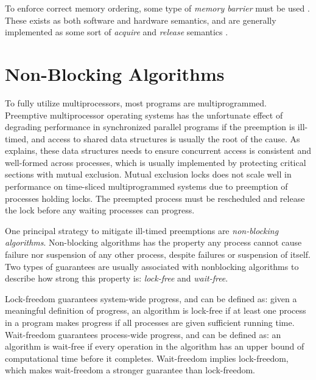 To enforce correct memory ordering, some type of \textit{memory barrier} must be used \citep{preshing2012barriers,preshing2012lockfree}. These exists as both software and hardware semantics, and are generally implemented as some sort of \textit{acquire} and \textit{release} semantics \citep{preshing2012acquire}.


\section{Non\hyp{}Blocking Algorithms}
\label{sec:nonblocking_algorithms}

To fully utilize multiprocessors, most programs are multiprogrammed. Preemptive multiprocessor operating systems has the unfortunate effect of degrading performance in synchronized parallel programs if the preemption is ill\hyp{}timed, and access to shared data structures is usually the root of the cause. As \citet{michael1998nonblocking} explains, these data structures needs to ensure concurrent access is consistent and well\hyp{}formed across processes, which is usually implemented by protecting critical sections with mutual exclusion. Mutual exclusion locks does not scale well in performance on time\hyp{}sliced multiprogrammed systems \citep{zahorjan1991effect} due to preemption of processes holding locks. The preempted process must be rescheduled and release the lock before any waiting processes can progress.

One principal strategy to mitigate ill\hyp{}timed preemptions are \textit{non\hyp{}blocking algorithms}. Non\hyp{}blocking algorithms has the property any process cannot cause failure nor suspension of any other process, despite failures or suspension of itself. Two types of guarantees are usually associated with nonblocking algorithms to describe how strong this property is: \textit{lock\hyp{}free} and \textit{wait\hyp{}free}. 

Lock\hyp{}freedom guarantees system\hyp{}wide progress, and can be defined as: given a meaningful definition of progress, an algorithm is lock\hyp{}free if at least one process in a program makes progress if all processes are given sufficient running time. Wait\hyp{}freedom guarantees process\hyp{}wide progress, and can be defined as: an algorithm is wait\hyp{}free if every operation in the algorithm has an upper bound of computational time before it completes. Wait\hyp{}freedom implies lock\hyp{}freedom, which makes wait\hyp{}freedom a stronger guarantee than lock\hyp{}freedom.

